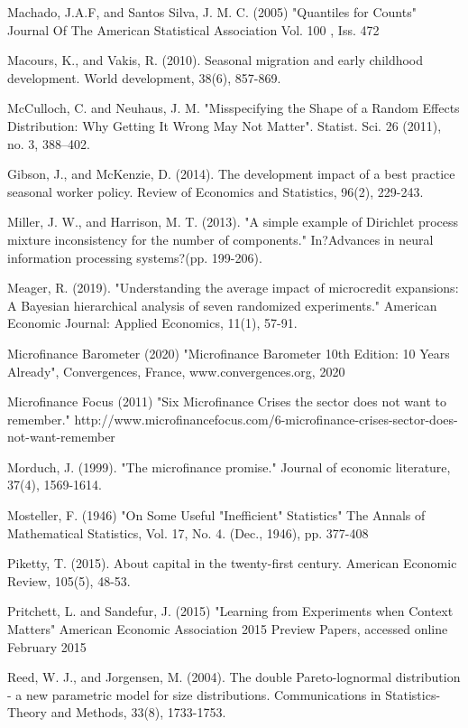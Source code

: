 \documentclass[english,12pt]{article}\usepackage{lmodern}
\numberwithin{equation}{section}
\begin{document}
\begin{thebibliography}{99}
 Machado, J.A.F, and Santos Silva, J. M. C. (2005) "Quantiles for Counts" Journal Of The American Statistical Association Vol. 100 , Iss. 472

 Macours, K., and Vakis, R. (2010). Seasonal migration and early childhood development. World development, 38(6), 857-869.

 McCulloch, C. and Neuhaus, J. M. "Misspecifying the Shape of a Random Effects Distribution: Why Getting It Wrong May Not Matter". Statist. Sci. 26 (2011), no. 3, 388--402.

 Gibson, J., and McKenzie, D. (2014). The development impact of a best practice seasonal worker policy. Review of Economics and Statistics, 96(2), 229-243.

 Miller, J. W., and Harrison, M. T. (2013). "A simple example of Dirichlet process mixture inconsistency for the number of components." In?Advances in neural information processing systems?(pp. 199-206).

 Meager, R. (2019). "Understanding the average impact of microcredit expansions: A Bayesian hierarchical analysis of seven randomized experiments." American Economic Journal: Applied Economics, 11(1), 57-91.

 Microfinance Barometer (2020) "Microfinance Barometer 10th Edition: 10 Years Already", Convergences, France, www.convergences.org, 2020

 Microfinance Focus (2011) "Six Microfinance Crises the sector does not want to remember." http://www.microfinancefocus.com/6-microfinance-crises-sector-does-not-want-remember

 Morduch, J. (1999). "The microfinance promise." Journal of economic literature, 37(4), 1569-1614.

 Mosteller, F. (1946) "On Some Useful "Inefficient" Statistics" The Annals of Mathematical Statistics, Vol. 17, No. 4. (Dec., 1946), pp. 377-408

 Piketty, T. (2015). About capital in the twenty-first century. American Economic Review, 105(5), 48-53.

 Pritchett, L. and Sandefur, J. (2015) "Learning from Experiments when Context Matters"  American Economic Association 2015 Preview Papers, accessed online February 2015

 Reed, W. J., and Jorgensen, M. (2004). The double Pareto-lognormal distribution - a new parametric model for size distributions. Communications in Statistics-Theory and Methods, 33(8), 1733-1753.


\end{thebibliography}
\end{document}

